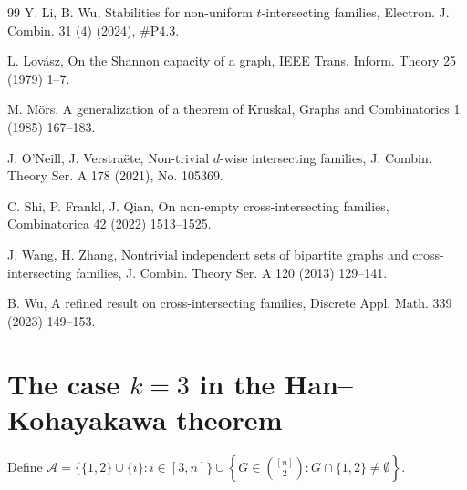 \documentclass[11pt]{article}
\numberwithin{equation}{section}
\begin{document}
\begin{thebibliography}{99}
Y. Li, B. Wu, Stabilities for non-uniform $t$-intersecting families, Electron. J. Combin. 31 (4) (2024), \#P4.3.


L. Lov\'{a}sz, 
On the Shannon capacity of a graph,  
IEEE Trans. Inform. Theory 25 (1979)  1--7.  


M. M{\"o}rs, A generalization of a theorem of Kruskal, Graphs and Combinatorics 1 (1985) 167--183.

J. O'Neill, J. Verstra\"{e}te, Non-trivial $d$-wise intersecting families, J. Combin. Theory Ser. A 178 (2021), No. 105369.

C. Shi,  P. Frankl, J. Qian, 
 On non-empty cross-intersecting families, 
 Combinatorica 42 (2022) 1513--1525.





J. Wang, H. Zhang, 
Nontrivial independent sets of bipartite graphs and cross-intersecting families,
J. Combin. Theory Ser. A 120 (2013) 129--141.

B. Wu, A refined result on cross-intersecting families, Discrete Appl. Math. 339 (2023) 149--153.



\end{thebibliography}


\appendix
\section{The case $k=3$ in the Han--Kohayakawa theorem}

\label{App-A}

Define  $\mathcal{A}=\{\{1,2\} \cup\{i\}: i \in[3, n]\}\cup\left\{G \in\binom{[n]}{2}:  G\cap \{1,2\}\neq \emptyset\right\}.$
\end{document}

